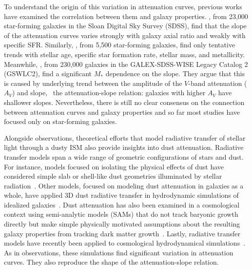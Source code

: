 To understand the origin of this variation in attenuation curves, previous
works have examined the correlation between them and galaxy properties. 
\cite{wild2011}, from 23,000 star-forming galaxies in the Sloan Digital
Sky Survey (SDSS), find that the slope of the attenuation curves varies 
strongly with galaxy axial ratio and weakly with specific SFR. Similarly, 
\cite{battisti2017}, from 5,500 star-forming galaxies, find only tentative
trends with stellar age, specific star formation rate, stellar mass, and
metallicity. Meanwhile, \cite{salim2018}, from 230,000 galaxies in the
GALEX-SDSS-WISE Legacy Catalog 2 (GSWLC2), find a significant $M_*$ 
dependence on the slope. They argue that this is caused by underlying trend
between the amplitude of the $V$-band attenuation ($A_V$) and slope,
\ie~the attenuation-slope relation: galaxies with higher $A_V$ have shallower
slopes. Nevertheless, there is still no clear consensus on the connection 
between attenuation curves and galaxy properties and so far most studies have
focused only on star-forming galaxies.

Alongside observations, theoretical efforts that model radiative transfer of
stellar light through a dusty ISM also provide insights into dust attenuation.
Radiative transfer models span a wide range of geometric configurations of
stars and dust. For instance, models focused on isolating the physical effects
of dust have considered simple slab or shell-like dust geometries illuminated
by stellar radiation~\citep[\eg][]{witt1996, witt2000, seon2016}. Other models,
focused on modeling dust attenuation in galaxies as a whole, have applied 3D
dust radiative transfer in hydrodynamic simulations of idealized
galaxies~\citep[\eg][]{jonsson2006, rocha2008, hayward2015, natale2015,
hou2017}. Dust attenuation has also been examined in a cosmological context
using semi-analytic models (SAMs) that do not track baryonic growth directly 
but make simple physically motivated assumptions about the resulting galaxy
properties from tracking dark matter growth~\citep[\eg][]{granato2000,
fontanot2009, wilkins2012, gonzalezperez2013}. Lastly, radiative transfer
models have recently been applied to cosmological hydrodynamical
simulations~\cite[\eg]{camps2015, narayanan2018, trayford2020}. As in
observations, these simulations find significant variation in attenuation
curves. They also reproduce the shape of the attenuation-slope relation. 

